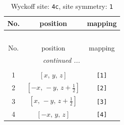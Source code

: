 \documentclass[fleqn,8pt]{jsarticle}
\begin{document}
\renewcommand{\arraystretch}{1.2}
\begin{longtable}{ccc}
\caption{Wyckoff site: {\tt 4c}, site symmetry: {\tt 1}}
 \\
 \hline \hline
No. & position & mapping \\ \hline \endfirsthead

\multicolumn{2}{l}{\tablename\ \thetable{}} \\
 \hline \hline
No. & position & mapping \\ \hline \endhead

 \hline \hline
\multicolumn{2}{r}{\footnotesize\it continued ...} \\ \endfoot

 \hline \hline
\multicolumn{2}{r}{} \\ \endlastfoot

1 & $\left[ x,\, y,\, z \right]$ & {\tt [1]} \\ \hline
2 & $\left[ - x,\, - y,\, z + \frac{1}{2} \right]$ & {\tt [2]} \\ \hline
3 & $\left[ x,\, - y,\, z + \frac{1}{2} \right]$ & {\tt [3]} \\ \hline
4 & $\left[ - x,\, y,\, z \right]$ & {\tt [4]} \\
\end{longtable}
\end{document}
